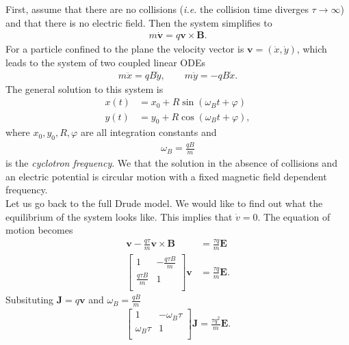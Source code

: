         \indent First, assume that there are no collisions (\textit{i.e.} the collision time diverges $\tau \rightarrow\infty$) and that there is no electric field. Then the system simplifies to
        \begin{align}
            m\dot{\bm{v}} =q \bm{v}\times \bm{B}.
        \end{align}
        For a particle confined to the plane the velocity vector is $\bm{v} = (\dot{x}, \dot{y})$, which leads to the system of two coupled linear ODEs
        \begin{align}
            m \ddot{x} = q B \dot{y}, \qquad m \ddot{y}= -q B \dot{x}.
        \end{align}
        The general solution to this system is
        \begin{align}
            x(t) &= x_0 + R \sin\left(\omega_Bt + \varphi \right) \\
            y(t) &= y_0 + R \cos\left(\omega_Bt + \varphi \right),
        \end{align}
        where $x_0, y_0, R, \varphi$ are all integration constants and
        \begin{align}
            \omega_B = \frac{q B}{m}
        \end{align}
        is the \textit{cyclotron frequency}.
        We that the solution in the absence of collisions and an electric potential is circular motion with a fixed magnetic field dependent frequency.\\
        Let us go back to the full Drude model. We would like to find out what the equilibrium of the system looks like. This implies that $\dot{v} =0$. The equation of motion becomes 
        \begin{align}
            \bm{v} - \frac{q \tau}{m}\bm{v}\times\bm{B}  &=\frac{\tau q}{m} \bm{E} \\
            \begin{bmatrix}
                1 & -\frac{q \tau B}{m} \\
                \frac{q \tau B}{m} & 1 \\
            \end{bmatrix} \bm{v} &= \frac{\tau q}{m} \bm{E}.
        \end{align}
        Subsituting $\bm{J} = q \bm{v}$ and $\omega_B = \frac{q B}{m}$
        \begin{align}
            \begin{bmatrix}
                1 & -\omega_B \tau \\
                \omega_B \tau & 1 \\
            \end{bmatrix}\bm{J} = \frac{\tau q^2}{m} \bm{E}.
        \end{align}
